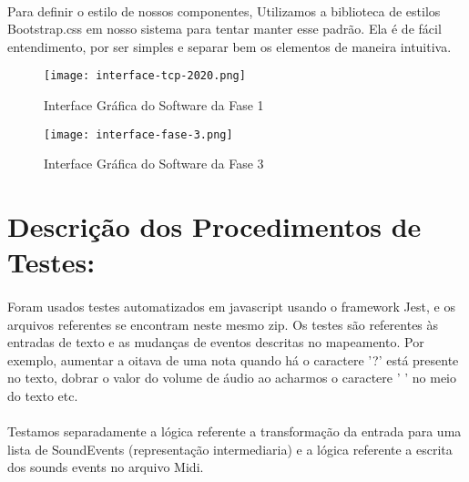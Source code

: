 \documentclass[12pt]{article}
\begin{document}
\paragraph{} Para definir o estilo de nossos componentes, Utilizamos a biblioteca de estilos Bootstrap.css em nosso sistema para tentar manter esse padrão. Ela é de fácil entendimento, por ser simples e separar bem os elementos de maneira intuitiva.

\vspace{0.3cm}

\begin{figure}[htp]
    \centering
    \texttt{[image: interface-tcp-2020.png]}
    \caption{Interface Gráfica do Software da Fase 1}
    \label{fig:interfacef1}
\end{figure}

\newpage

\begin{figure}[htp]
    \centering
    \texttt{[image: interface-fase-3.png]}
    \caption{Interface Gráfica do Software da Fase 3}
    \label{fig:interfacef3}
\end{figure}

\newpage

\section{Descrição dos Procedimentos de Testes:}

\paragraph{}Foram usados testes automatizados em javascript usando o framework Jest, e os arquivos referentes se encontram neste mesmo zip. Os testes são referentes às entradas de texto e as mudanças de eventos descritas no mapeamento. Por exemplo, aumentar a oitava de uma nota quando há o caractere '?' está presente no texto, dobrar o valor do volume de áudio ao acharmos o caractere ' ' no meio do texto etc.

\paragraph{}Testamos separadamente a lógica referente a transformação da entrada para uma lista de SoundEvents (representação intermediaria) e a lógica referente a escrita dos sounds events no arquivo Midi.

\vspace{0.3cm}
\end{document}
